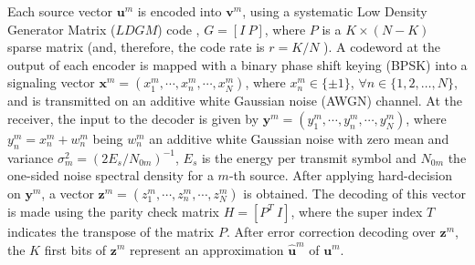\documentclass[journal]{IEEEtran}
\begin{document}
Each source vector $\mathbf{u}^{m}$ is encoded into $\mathbf{v}^{m}$,  using a systematic  
Low Density Generator Matrix ($LDGM$) code \cite{art-garciafrias}, $G=[I~P]$, 
where $P$ is a $K\times(N-K)$ sparse matrix (and, therefore, the code rate is $r=K/N$ ).
A codeword at the output of each encoder is mapped with a binary phase shift keying (BPSK) into a 
signaling vector $\mathbf{x}^{m}=(x^{m}_1, \cdots, x^{m}_n, \cdots, x^{m}_{N}) $, 
where $x^{m}_n \in \{\pm 1 \}$, $\forall n\in \{1, 2, \ldots, N\}$, 
and is transmitted on an additive white
Gaussian noise (AWGN) channel. At the receiver, the input to the decoder is
given by $\mathbf{y}^{m}=(y_1^{m}, \cdots, y^{m}_n, \cdots, y^{m}_{N})$, where
$y^{m}_{n}=x^{m}_{n} + w^{m}_{n}$  being $w^{m}_{n}$ an additive white Gaussian
noise with zero mean and variance $\sigma^{2}_{m}=(2E_{s}/N_{0 m})^{-1}$,
 $E_s$ is the energy per transmit symbol and $N_{0m}$  the one-sided
noise spectral density for a $m$-th source. After applying hard-decision on
$\mathbf{y}^{m}$, a vector $\mathbf{z}^{m}=(z^{m}_1, \cdots, z^{m}_n, \cdots, z^{m}_N)$
is obtained. The decoding of  this vector is made using the parity check 
matrix $H=[P^T~I]$, where the super index $T$ indicates the transpose of the matrix $P$.
After error correction decoding over $\mathbf{z}^{m}$, the $K$ first bits of $\mathbf{z}^{m}$ represent an
approximation $\mathbf{\hat{u}}^{m}$ of $\mathbf{u}^{m}$.

\end{document}
